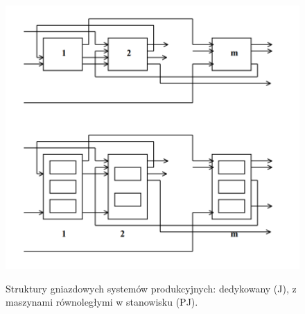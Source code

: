 \documentclass[10pt, a
4paper]{article}
\begin{document}
\begin{figure}[H]
\begin{center}
\label{diagram}
\includegraphics[scale = 0.5]{Rysunki/szeregowanie2.png}
\caption{Struktury gniazdowych systemów produkcyjnych: dedykowany (J), z maszynami równoległymi w stanowisku (PJ).}
\end{center}
\end{figure}
\end{document}
